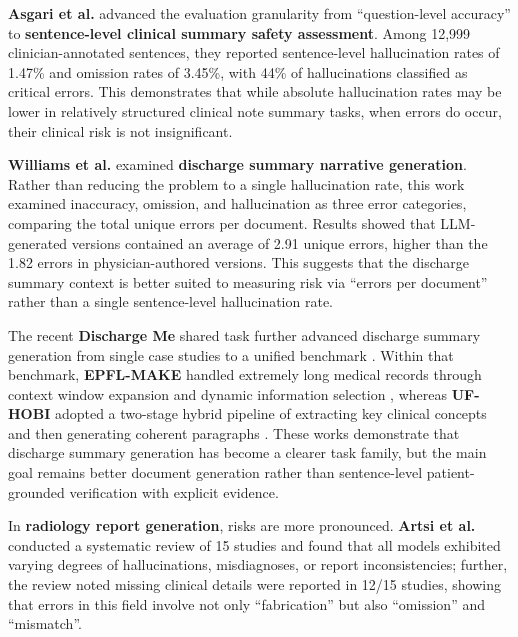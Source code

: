 \documentclass[11pt]{article}
\begin{document}
\textbf{Asgari et al.} \citep{asgari2025clinicalSafetySummarisation} advanced the evaluation granularity from ``question-level accuracy'' to \textbf{sentence-level clinical summary safety assessment}. Among 12,999 clinician-annotated sentences, they reported sentence-level hallucination rates of 1.47\% and omission rates of 3.45\%, with 44\% of hallucinations classified as critical errors. This demonstrates that while absolute hallucination rates may be lower in relatively structured clinical note summary tasks, when errors do occur, their clinical risk is not insignificant.

\textbf{Williams et al.} \citep{williams2025dischargeSummaries} examined \textbf{discharge summary narrative generation}. Rather than reducing the problem to a single hallucination rate, this work examined inaccuracy, omission, and hallucination as three error categories, comparing the total unique errors per document. Results showed that LLM-generated versions contained an average of 2.91 unique errors, higher than the 1.82 errors in physician-authored versions. This suggests that the discharge summary context is better suited to measuring risk via ``errors per document'' rather than a single sentence-level hallucination rate.

The recent \textbf{Discharge Me} shared task further advanced discharge summary generation from single case studies to a unified benchmark \citep{xu2024dischargeMeSharedTask}. Within that benchmark, \textbf{EPFL-MAKE} handled extremely long medical records through context window expansion and dynamic information selection \citep{wu2024epflMakeDischargeMe}, whereas \textbf{UF-HOBI} adopted a two-stage hybrid pipeline of extracting key clinical concepts and then generating coherent paragraphs \citep{lyu2024ufHobiDischargeMe}. These works demonstrate that discharge summary generation has become a clearer task family, but the main goal remains better document generation rather than sentence-level patient-grounded verification with explicit evidence.

In \textbf{radiology report generation}, risks are more pronounced. \textbf{Artsi et al.} \citep{artsi2025radiologyReview} conducted a systematic review of 15 studies and found that all models exhibited varying degrees of hallucinations, misdiagnoses, or report inconsistencies; further, the review noted missing clinical details were reported in 12/15 studies, showing that errors in this field involve not only ``fabrication'' but also ``omission'' and ``mismatch''.
\end{document}
